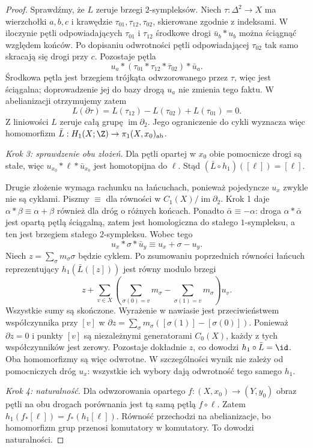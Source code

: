 \begin{proof}
Sprawdźmy, że $L$ zeruje brzegi $2$-sympleksów.
Niech $\tau:\Delta^2\to X$ ma wierzchołki $a,b,c$ i krawędzie
$\tau_{01},\tau_{12},\tau_{02}$, skierowane zgodnie z indeksami.
W iloczynie pętli odpowiadających $\tau_{01}$ i $\tau_{12}$
środkowe drogi $\bar u_b*u_b$ można ściągnąć względem końców.
Po dopisaniu odwrotności pętli odpowiadającej $\tau_{02}$
tak samo skracają się drogi przy $c$. Pozostaje pętla
\[
 u_a*(\tau_{01}*\tau_{12}*\bar\tau_{02})*\bar u_a.
\]
Środkowa pętla jest brzegiem trójkąta odwzorowanego przez $\tau$,
więc jest ściągalna; doprowadzenie jej do bazy drogą $u_a$
nie zmienia tego faktu. W abelianizacji otrzymujemy zatem
\[
 L(\partial\tau)
 =L(\tau_{12})-L(\tau_{02})+L(\tau_{01})=0.
\]
Z liniowości $L$ zeruje całą grupę $\operatorname{im}\partial_2$.
Jego ograniczenie do cykli wyznacza więc homomorfizm
$\bar L:H_1(X;\Z)\to\pi_1(X,x_0)_{\mathrm{ab}}$.

\emph{Krok 3: sprawdzenie obu złożeń.}
Dla pętli opartej w $x_0$ obie pomocnicze drogi są stałe,
więc $u_{x_0}*\ell*\bar u_{x_0}$ jest homotopijna do $\ell$.
Stąd $(\bar L\circ h_1)([\ell])=[\ell]$.

Drugie złożenie wymaga rachunku na łańcuchach, ponieważ pojedyncze
$u_x$ zwykle nie są cyklami. Piszmy $\equiv$ dla równości
w $C_1(X)/\operatorname{im}\partial_2$.
Krok 1 daje $\alpha*\beta\equiv\alpha+\beta$ również dla dróg
o różnych końcach. Ponadto $\bar\alpha\equiv-\alpha$:
droga $\alpha*\bar\alpha$ jest opartą pętlą ściągalną,
zatem jest homologiczna do stałego $1$-sympleksu, a ten jest
brzegiem stałego $2$-sympleksu. Wobec tego
\[
 u_x*\sigma*\bar u_y\equiv u_x+\sigma-u_y.
\]
Niech $z=\sum_\sigma m_\sigma\sigma$ będzie cyklem.
Po zsumowaniu poprzednich równości łańcuch reprezentujący
$h_1(\bar L([z]))$ jest równy modulo brzegi
\[
 z+\sum_{v\in X}
 \left(\sum_{\sigma(0)=v}m_\sigma
       -\sum_{\sigma(1)=v}m_\sigma\right)u_v.
\]
Wszystkie sumy są skończone. Wyrażenie w nawiasie jest
przeciwieństwem współczynnika przy $[v]$ w
$\partial z=\sum_\sigma m_\sigma([\sigma(1)]-[\sigma(0)])$.
Ponieważ $\partial z=0$ i punkty $[v]$ są niezależnymi generatorami
$C_0(X)$, każdy z tych współczynników jest zerowy.
Pozostaje dokładnie $z$, co dowodzi $h_1\circ\bar L=\id$.
Oba homomorfizmy są więc odwrotne. W szczególności wynik nie zależy
od pomocniczych dróg $u_x$: wszystkie ich wybory dają odwrotność
tego samego $h_1$.

\emph{Krok 4: naturalność.}
Dla odwzorowania opartego $f:(X,x_0)\to(Y,y_0)$ obraz pętli
na obu drogach porównania jest tą samą pętlą $f\circ\ell$.
Zatem $h_1(f_*[\ell])=f_*(h_1[\ell])$.
Równość przechodzi na abelianizacje, bo homomorfizm grup
przenosi komutatory w komutatory. To dowodzi naturalności.
\end{proof}

